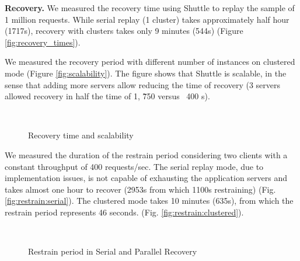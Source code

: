 \textbf{Recovery.}
We measured the recovery time using Shuttle to replay the sample of 1 million requests. While serial replay (1 cluster) takes approximately half hour (1717s), recovery with clusters takes only 9 minutes (544s) (Figure \ref{fig:recovery_times}).

We measured the recovery period with different number of instances on clustered mode (Figure \ref{fig:scalability}). The figure shows that Shuttle is scalable, in the sense that adding more servers allow reducing the time of recovery (3 servers allowed recovery in half the time of 1, \~750 versus ~400 s). 

\begin{figure}[tbh]
\vspace{-5mm}
  \LARGE
  \mbox{
  }
  \caption{Recovery time and scalability}
  \vspace{-3mm}
\end{figure}

We measured the duration of the restrain period considering two clients with a constant throughput of 400 requests/sec. The serial replay mode, due to implementation issues, is not capable of exhausting the application servers and takes almost one hour to recover (2953s from which 1100s restraining) (Fig. \ref{fig:restrain:serial}). The clustered mode takes 10 minutes (635s), from which the restrain period represents 46 seconds. (Fig. \ref{fig:restrain:clustered}).

\begin{figure}[tbh]
\vspace{-5mm}
  \LARGE
  \mbox{
  }
  \caption{Restrain period in Serial and Parallel Recovery}
  \vspace{-3mm}
\end{figure}


